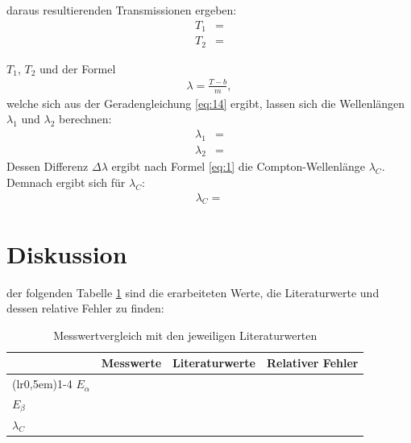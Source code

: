     \justifying daraus resultierenden Transmissionen ergeben:
    \begin{align}
        T_1 &= \text{} \label{eq:19}\\
        T_2 &= \text{} \label{eq:20}
    \end{align}

    \justifying $T_1$, $T_2$ und der Formel
    \begin{align}
        \lambda = \frac{T - b}{m},
    \end{align}
    welche sich aus der Geradengleichung \eqref{eq:14} ergibt, lassen sich die Wellenlängen $\lambda_1$ und $\lambda_2$ berechnen:
    \begin{align}
        \lambda_1 &= \text{}\\
        \lambda_2 &= \text{}
    \end{align} 
    Dessen Differenz $\Delta \lambda$ ergibt nach Formel \eqref{eq:1} die Compton-Wellenlänge $\lambda_C$.
    Demnach ergibt sich für $\lambda_C$:
    \begin{align}
        \lambda_C = \text{} \label{eq:21}
    \end{align}


\newpage
\section{Diskussion}

    \justifying der folgenden Tabelle \ref{tab:3} sind die erarbeiteten Werte, die Literaturwerte und dessen relative Fehler zu finden: 

    \begin{table}[H]
    \centering
        \begin{tabular}{l c c r}
            \toprule
            \multicolumn{1}{c}{} & \multicolumn{1}{c}{Messwerte} & \multicolumn{1}{c}{Literaturwerte} & \multicolumn{1}{c}{Relativer Fehler}\\
            \cmidrule(lr{0,5em}){1-4}
            $E_{\alpha}$           &             &  \cite{NIST}            &  \\
            $E_{\beta}$            &             &  \cite{NIST}            &  \\
            $\lambda_C$            &             &  \cite{scipy}           &  \\
            \bottomrule
        \end{tabular}
    \caption{Messwertvergleich mit den jeweiligen Literaturwerten}
    \label{tab:3}
    \end{table}

